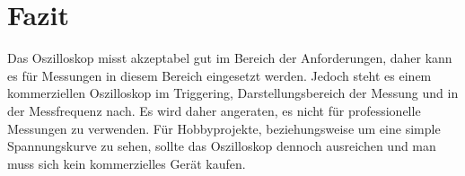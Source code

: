 \section{Fazit}

Das Oszilloskop misst akzeptabel gut im Bereich der Anforderungen, daher
kann es für Messungen in diesem Bereich eingesetzt werden.
Jedoch steht es einem kommerziellen Oszilloskop im Triggering, Darstellungsbereich der Messung und 
in der Messfrequenz nach.
Es wird daher angeraten, es nicht für professionelle Messungen zu verwenden.
Für Hobbyprojekte, beziehungsweise um eine simple Spannungskurve zu sehen,
sollte das Oszilloskop dennoch ausreichen und man muss sich kein kommerzielles Gerät kaufen.